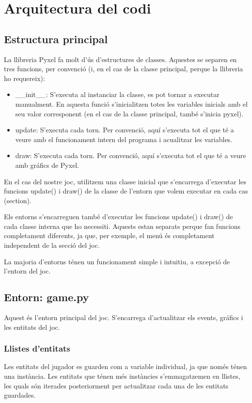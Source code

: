 \section{Arquitectura del codi}

\subsection{Estructura principal}
La llibreria Pyxel fa molt d'\'us d'estructures de classes.
Aquestes se separen en tres funcions, per convenci\'o
(i, en el cas de la classe principal, perque la llibreria ho requereix):

\begin{itemize}
\item{\_\_init\_\_:
	S'executa al instanciar la classe, es pot tornar a executar manualment.
	En aquesta funci\'o s'inicialitzen totes les variables inicials amb el seu valor
	corresponent (en el cas de la classe principal, tamb\'e s'inicia pyxel).
	}
\item{update:
	S'executa cada torn. 
	Per convenci\'o, aqu\'i s'executa tot el que t\'e a veure amb
	el funcionament intern del programa i acualitzar les variables.
	}
\item{draw:
	S'executa cada torn.
	Per convenci\'o, aqu\'i s'executa tot el que t\'e a veure amb
	gr\'afics de Pyxel.
}
\end{itemize}

En el cas del nostre joc,
utilitzem una classe inicial que s'encarrega d'executar
les funcions update() i draw() de la classe de
l'entorn que volem executar en cada cas (section).

Els entorns s'encarreguen tamb\'e d'executar les funcions update() i draw()
de cada classe interna que ho necessiti.
Aquests estan separats perque fan funcions completament diferents,
ja que, per exemple, el men\'u \'es completament independent de la secci\'o del joc.

La majoria d'entorns t\'enen un funcionament simple i intuitiu,
a excepci\'o de l'entorn del joc.


\subsection{Entorn: game.py}

Aquest \'es l'entorn principal del joc.
S'encarrega d'actualitzar els events, gr\'afics i les entitats del joc.


\subsubsection{Llistes d'entitats}
Les entitats del jugador es guarden com a variable individual,
ja que nom\'es t\'enen una inst\`ancia.
Les entitats que t\'enen m\'es inst\`ancies s'emmagatzemen en llistes,
les quals s\'on iterades posteriorment per
actualitzar cada una de les entitats guardades.

